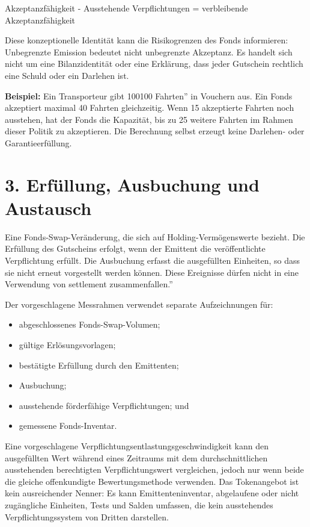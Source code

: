 \documentclass[11pt]{article}
\begin{document}
Akzeptanzfähigkeit - Ausstehende Verpflichtungen = verbleibende Akzeptanzfähigkeit

Diese konzeptionelle Identität kann die Risikogrenzen des Fonds informieren: Unbegrenzte Emission bedeutet nicht unbegrenzte Akzeptanz. Es handelt sich nicht um eine Bilanzidentität oder eine Erklärung, dass jeder Gutschein rechtlich eine Schuld oder ein Darlehen ist.

\textbf{Beispiel:} Ein Transporteur gibt 100100 Fahrten'' in Vouchern aus. Ein Fonds akzeptiert maximal 40 Fahrten gleichzeitig. Wenn 15 akzeptierte Fahrten noch ausstehen, hat der Fonds die Kapazität, bis zu 25 weitere Fahrten im Rahmen dieser Politik zu akzeptieren. Die Berechnung selbst erzeugt keine Darlehen- oder Garantieerfüllung.



\section*{3. Erfüllung, Ausbuchung und Austausch}

Eine Fonds-Swap-Veränderung, die sich auf Holding-Vermögenswerte bezieht. Die Erfüllung des Gutscheins erfolgt, wenn der Emittent die veröffentlichte Verpflichtung erfüllt. Die Ausbuchung erfasst die ausgefüllten Einheiten, so dass sie nicht erneut vorgestellt werden können. Diese Ereignisse dürfen nicht in eine Verwendung von settlement zusammenfallen.''

Der vorgeschlagene Messrahmen verwendet separate Aufzeichnungen für:

\begin{itemize}[leftmargin=*]
\item abgeschlossenes Fonds-Swap-Volumen;
\item gültige Erlösungsvorlagen;
\item bestätigte Erfüllung durch den Emittenten;
\item Ausbuchung;
\item ausstehende förderfähige Verpflichtungen; und
\item gemessene Fonds-Inventar.
\end{itemize}
Eine vorgeschlagene Verpflichtungsentlastungsgeschwindigkeit kann den ausgefüllten Wert während eines Zeitraums mit dem durchschnittlichen ausstehenden berechtigten Verpflichtungswert vergleichen, jedoch nur wenn beide die gleiche offenkundigte Bewertungsmethode verwenden. Das Tokenangebot ist kein ausreichender Nenner: Es kann Emittenteninventar, abgelaufene oder nicht zugängliche Einheiten, Tests und Salden umfassen, die kein ausstehendes Verpflichtungssystem von Dritten darstellen.
\end{document}
